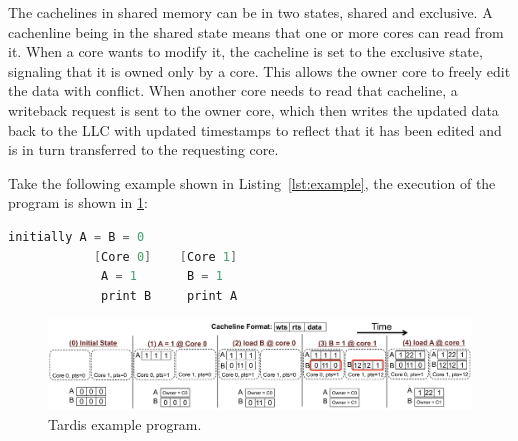 \documentclass[12pt]{article}
\begin{document}
The cachelines in shared memory can be in two states, shared and exclusive. A cachenline being in the shared state means that one or more cores can read from it. When a core wants to modify it, the cacheline is set to the exclusive state, signaling that it is owned only by a core. This allows the owner core to freely edit the data with conflict. When another core needs to read that cacheline, a writeback request is sent to the owner core, which then writes the updated data back to the LLC with updated timestamps to reflect that it has been edited and is in turn transferred to the requesting core.



Take the following example shown in Listing~\ref{lst:example}, the 
execution of the program is shown in \cref{fig:example}:

\vspace{-.1in}
\begin{lstlisting}[language=C,label={lst:example},caption={Example 
Program}]
			  initially A = B = 0
			[Core 0]	[Core 1]
			 A = 1		 B = 1
			 print B	 print A
\end{lstlisting}


\begin{figure}
	\centering
	\includegraphics[width=0.95\columnwidth]{figs/example.pdf}
	\caption{ Tardis example program.}
	\label{fig:example}
\end{figure}
\end{document}
